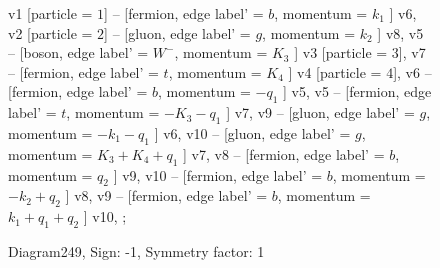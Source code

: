\documentclass{revtex4}
\begin{document}
\begin{figure}[!htb]
\begin{center}
{    %
v1 [particle = \(1\)] -- [fermion, edge label' = \(b\), momentum = \(k_{1}\) ] v6, 
v2 [particle = \(2\)] -- [gluon, edge label' = \(g\), momentum = \(k_{2}\) ] v8, 
v5 -- [boson, edge label' = \(W^{-}\), momentum = \(K_{3}\) ] v3 [particle = \(3\)], 
v7 -- [fermion, edge label' = \(t\), momentum = \(K_{4}\) ] v4 [particle = \(4\)], 
v6 -- [fermion, edge label' = \(b\), momentum = \(-q_{1}\) ] v5, 
v5 -- [fermion, edge label' = \(t\), momentum = \(-K_{3} - q_{1}\) ] v7, 
v9 -- [gluon, edge label' = \(g\), momentum = \(-k_{1} - q_{1}\) ] v6, 
v10 -- [gluon, edge label' = \(g\), momentum = \(K_{3} + K_{4} + q_{1}\) ] v7, 
v8 -- [fermion, edge label' = \(b\), momentum = \(q_{2}\) ] v9, 
v10 -- [fermion, edge label' = \(b\), momentum = \(-k_{2} + q_{2}\) ] v8, 
v9 -- [fermion, edge label' = \(b\), momentum = \(k_{1} + q_{1} + q_{2}\) ] v10, 
};
\end{center}
\caption{Diagram249, Sign: -1, Symmetry factor: 1}
\end{figure}
\newpage
\end{document}
